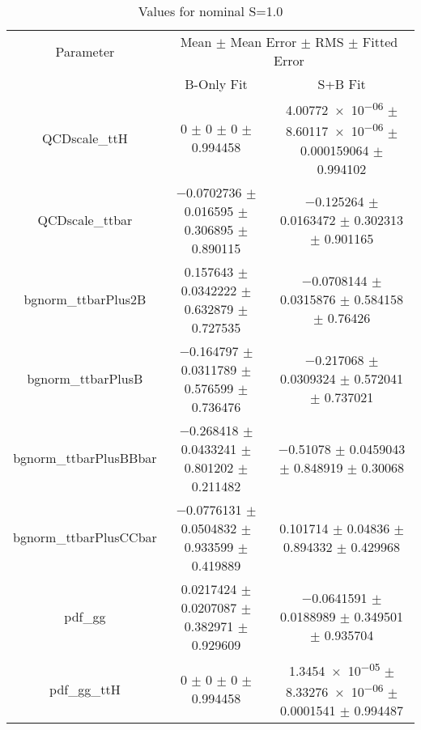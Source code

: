 \begin{table}
\centering
\caption{Values for nominal S=1.0}
\begin{tabular}{ccc}
\toprule
Parameter & \multicolumn{2}{c}{Mean $\pm$ Mean Error $\pm$ RMS $\pm$ Fitted Error}\\
 & B-Only Fit & S+B Fit\\
\midrule
QCDscale\_ttH & \num{0} $\pm$ \num{0} $\pm$ \num{0} $\pm$ \num{0.994458} & \num{4.00772e-06} $\pm$ \num{8.60117e-06} $\pm$ \num{0.000159064} $\pm$ \num{0.994102}\\
QCDscale\_ttbar & \num{-0.0702736} $\pm$ \num{0.016595} $\pm$ \num{0.306895} $\pm$ \num{0.890115} & \num{-0.125264} $\pm$ \num{0.0163472} $\pm$ \num{0.302313} $\pm$ \num{0.901165}\\
bgnorm\_ttbarPlus2B & \num{0.157643} $\pm$ \num{0.0342222} $\pm$ \num{0.632879} $\pm$ \num{0.727535} & \num{-0.0708144} $\pm$ \num{0.0315876} $\pm$ \num{0.584158} $\pm$ \num{0.76426}\\
bgnorm\_ttbarPlusB & \num{-0.164797} $\pm$ \num{0.0311789} $\pm$ \num{0.576599} $\pm$ \num{0.736476} & \num{-0.217068} $\pm$ \num{0.0309324} $\pm$ \num{0.572041} $\pm$ \num{0.737021}\\
bgnorm\_ttbarPlusBBbar & \num{-0.268418} $\pm$ \num{0.0433241} $\pm$ \num{0.801202} $\pm$ \num{0.211482} & \num{-0.51078} $\pm$ \num{0.0459043} $\pm$ \num{0.848919} $\pm$ \num{0.30068}\\
bgnorm\_ttbarPlusCCbar & \num{-0.0776131} $\pm$ \num{0.0504832} $\pm$ \num{0.933599} $\pm$ \num{0.419889} & \num{0.101714} $\pm$ \num{0.04836} $\pm$ \num{0.894332} $\pm$ \num{0.429968}\\
pdf\_gg & \num{0.0217424} $\pm$ \num{0.0207087} $\pm$ \num{0.382971} $\pm$ \num{0.929609} & \num{-0.0641591} $\pm$ \num{0.0188989} $\pm$ \num{0.349501} $\pm$ \num{0.935704}\\
pdf\_gg\_ttH & \num{0} $\pm$ \num{0} $\pm$ \num{0} $\pm$ \num{0.994458} & \num{1.3454e-05} $\pm$ \num{8.33276e-06} $\pm$ \num{0.0001541} $\pm$ \num{0.994487}\\
\bottomrule
\end{tabular}
\end{table}